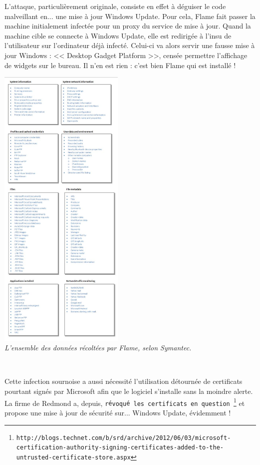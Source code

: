 \documentclass[11pt,twoside,a4paper]{article}
\begin{document}
\begin{minipage}[ht]{12.50cm}
	L'attaque, particuli{\`e}rement originale, consiste en effet {\`a} d{\'e}guiser le code malveillant en... une mise {\`a} jour Windows Update. Pour cela, Flame fait passer la machine initialement infect{\'e}e pour un proxy du service de mise {\`a} jour. Quand la machine cible se connecte {\`a} Windows Update, elle est redirig{\'e}e {\`a} l'insu de l'utilisateur sur l'ordinateur d{\'e}j{\`a} infect{\'e}. Celui-ci va alors servir une fausse mise {\`a} jour Windows : << Desktop Gadget Platform >>, cens{\'e}e permettre l'affichage de widgets sur le bureau. Il n'en est rien : c'est bien Flame qui est install{\'e} !~\\
\end{minipage} \hfill \begin{minipage}[ht]{6.25cm}	
	\includegraphics[width=6.00cm]{img/685331.jpg}
	~\\ \emph{L'ensemble des donn{\'e}es r{\'e}colt{\'e}es par Flame, selon Symantec.}
\end{minipage}
~

Cette infection sournoise a aussi n{\'e}cessit{\'e} l'utilisation d{\'e}tourn{\'e}e de certificats pourtant sign{\'e}s par Microsoft afin que le logiciel s'installe sans la moindre alerte. La firme de Redmond a, depuis, \texttt{r{\'e}voqu{\'e} les certificats en question~\footnote{\texttt{http://blogs.technet.com/b/srd/archive/2012/06/03/microsoft-certification-authority-signing-certificates-added-to-the-untrusted-certificate-store.aspx}}} et propose une mise {\`a} jour de s{\'e}curit{\'e} sur... Windows Update, {\'e}videmment !~\\
\end{document}
